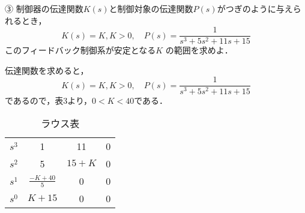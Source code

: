 ③ 制御器の伝達関数$K(s)$と制御対象の伝達関数$P(s)$がつぎのように与えられるとき，
$$
K(s)=K, K>0, \quad P(s)=\frac{1}{s^3+5 s^2+11 s+15}
$$
このフィードバック制御系が安定となる$K$ の範囲を求めよ．


伝達関数を求めると，
$$
K(s)=K, K>0, \quad P(s)=\frac{1}{s^3+5 s^2+11 s+15}
$$
であるので，表3より，$0<K<40$である．

\begin{table}[H]
    \centering
    \begin{tabular}{c|ccc}
        \hline
        $s^3$ & 1 & 11 & 0 \\
        $s^2$ & 5 & $15+K$ & 0 \\
        $s^1$ & $\frac{-K+40}{5}$ & 0 & 0 \\
        $s^0$ & $K+15$ & 0 & 0 \\ \hline
        
    \end{tabular}
    \caption{ラウス表}
\end{table}